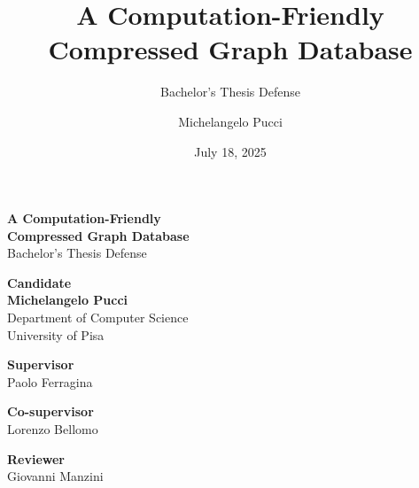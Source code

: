 \documentclass[11pt]{beamer}
\title[A Computation-Friendly Compressed Graph Database]{A Computation-Friendly\\Compressed Graph Database}
\subtitle{Bachelor's Thesis Defense}
\author[M. Pucci]{Michelangelo Pucci}
\institute[UniPI]{University of Pisa}
\date{July 18, 2025}
\begin{document}
\begin{frame}

  \vspace{0.2cm}

  \begin{center}
    \color{white}
    {\Large\bfseries A Computation-Friendly}\\[0.2cm]
    {\Large\bfseries Compressed Graph Database}\\[0.4cm]
    {\normalsize Bachelor's Thesis Defense}
  \end{center}

  \vspace{0.25cm}

  \begin{center}
    {\normalsize\color{primary}\textbf{Candidate}}\\[0.1cm]
    {\large\textbf{Michelangelo Pucci}}\\[0.3cm]
    {\small\color{primary!60!black}Department of Computer Science\\University of Pisa}
  \end{center}

  \vspace{0.25cm}

  \begin{center}
    \begin{tcolorbox}[
      colback=lightgray,
      colframe=primary,
      boxrule=0pt,
      width=0.85\textwidth,
      arc=3mm,
      left=2mm,right=2mm,top=2mm,bottom=2mm
    ]
      \begin{minipage}[t]{0.31\textwidth}
        \centering
        \textcolor{primary}{\scriptsize\textbf{Supervisor}}\\[1mm]
        \scriptsize Paolo Ferragina
      \end{minipage}
      \hfill
      \begin{minipage}[t]{0.31\textwidth}
        \centering
        \textcolor{primary}{\scriptsize\textbf{Co-supervisor}}\\[1mm]
        \scriptsize Lorenzo Bellomo
      \end{minipage}
      \hfill
      \begin{minipage}[t]{0.31\textwidth}
        \centering
        \textcolor{primary}{\scriptsize\textbf{Reviewer}}\\[1mm]
        \scriptsize Giovanni Manzini
      \end{minipage}
    \end{tcolorbox}
  \end{center}


\end{frame}
\end{document}
